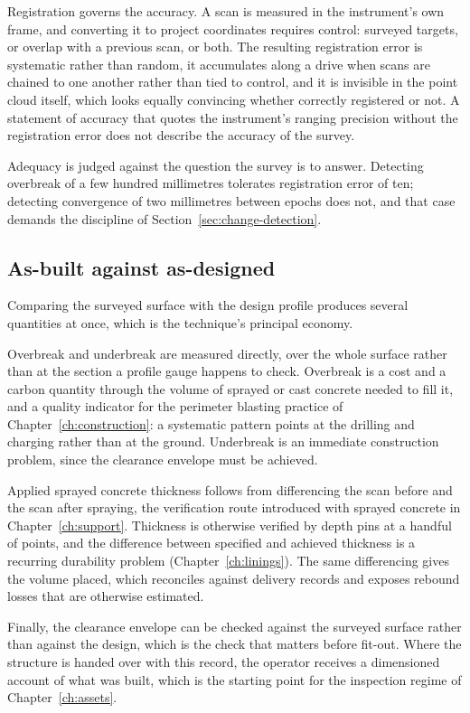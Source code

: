 Registration governs the accuracy. A scan is measured in the
instrument's own frame, and converting it to project coordinates requires
control: surveyed targets, or overlap with a previous scan, or both. The
resulting registration error is systematic rather than random, it accumulates
along a drive when scans are chained to one another rather than tied to
control, and it is invisible in the point cloud itself, which looks equally
convincing whether correctly registered or not. A statement of accuracy that
quotes the instrument's ranging precision without the registration error does
not describe the accuracy of the survey.

Adequacy is judged against the question the survey is to answer. Detecting overbreak of a few
hundred millimetres tolerates registration error of ten; detecting convergence
of two millimetres between epochs does not, and that case demands the
discipline of Section~\ref{sec:change-detection}.

\subsection{As-built against as-designed}
\label{sec:as-built}

Comparing the surveyed surface with the design profile produces several
quantities at once, which is the technique's principal economy.

Overbreak and underbreak are measured directly, over the whole surface rather
than at the section a profile gauge happens to check. Overbreak is a cost and
a carbon quantity through the volume of sprayed or cast concrete needed to fill
it, and a quality indicator for the perimeter blasting practice of
Chapter~\ref{ch:construction}: a systematic pattern points at the drilling and
charging rather than at the ground. Underbreak is an immediate construction
problem, since the clearance envelope must be achieved.

Applied sprayed concrete thickness follows from differencing the scan before
and the scan after spraying, the verification route introduced with sprayed
concrete in Chapter~\ref{ch:support}. Thickness is
otherwise verified by depth pins at a handful of points, and the difference
between specified and achieved thickness is a recurring durability problem
(Chapter~\ref{ch:linings}). The same differencing gives the volume placed,
which reconciles against delivery records and exposes rebound losses that are
otherwise estimated.

Finally, the clearance envelope can be checked against the surveyed surface
rather than against the design, which is the check that matters
before fit-out. Where the structure is handed over with this record, the
operator receives a dimensioned account of what was built, which is the
starting point for the inspection regime of Chapter~\ref{ch:assets}.

